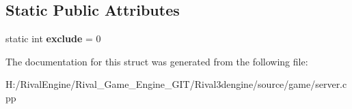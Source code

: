 \subsection*{Static Public Attributes}
\begin{DoxyCompactItemize}
\item 
\mbox{\label{structserver_1_1maprotation_a59786f2ea5fdc614983c46d0f8f0da9c}} 
static int {\bfseries exclude} = 0
\end{DoxyCompactItemize}


The documentation for this struct was generated from the following file\+:\begin{DoxyCompactItemize}
\item 
H\+:/\+Rival\+Engine/\+Rival\+\_\+\+Game\+\_\+\+Engine\+\_\+\+G\+I\+T/\+Rival3dengine/source/game/server.\+cpp\end{DoxyCompactItemize}
